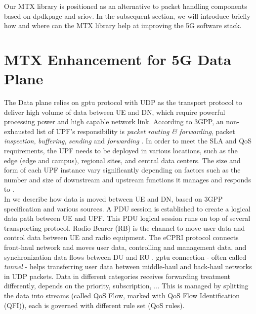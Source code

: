 Our \ac{MTX} library is positioned as an alternative to packet handling components based on \ac{dpdkpage} and \ac{sriov}. 
In the subsequent section, we will introduce briefly how and where can the MTX library help at improving the 5G software stack.

\section{MTX Enhancement for 5G Data Plane}
\label{sec:related_work:5g_dataplane_enhancement}

The Data plane relies on \ac{gptu} protocol with \ac{UDP} as the transport protocol to deliver high volume of data between \ac{UE} and \ac{DN}, which require powerful processing power and high capable network link.
According to \ac{3GPP}, an non-exhausted list of \ac{UPF}'s responsibility is \textit{packet routing \& forwarding}, packet \textit{inspection}, \textit{buffering}, \textit{sending} and \textit{forwarding} \cite{3gpp_5g_system_architect_spec_release_18}.
In order to meet the \ac{SLA} and \ac{QoS} requirements, the \ac{UPF} needs to be deployed in various locations, such as the edge (edge and campus), regional sites, and central data centers. 
The size and form of each \ac{UPF} instance vary significantly depending on factors such as the number and size of downstream and upstream functions it manages and responds to \cite{zte_upf_full_whitepaper}.
\\

In  we describe how data is moved between \ac{UE} and \ac{DN}, based on 3GPP specification and various sources.
A \ac{PDU} session is established to create a logical data path between \ac{UE} and \ac{UPF}.
This \ac{PDU} logical session runs on top of several transporting protocol.
Radio Bearer (RB) is the channel to move user data and control data between UE and radio equipment.
The \ac{eCPRI} protocol connects front-haul network and moves user data, controlling and management data, and synchronization data flows between DU and RU \cite{eCPRI_spec}.
\ac{gptu} connection - often called \textit{tunnel} - helps transferring user data between middle-haul and back-haul networks in UDP packets.
Data in different categories receives forwarding treatment differently, depends on the priority, subscription, ... 
This is managed by splitting the data into streams (called \ac{QoS} Flow, marked with QoS Flow Identification (QFI)), each is governed with different rule set (QoS rules).
\\

